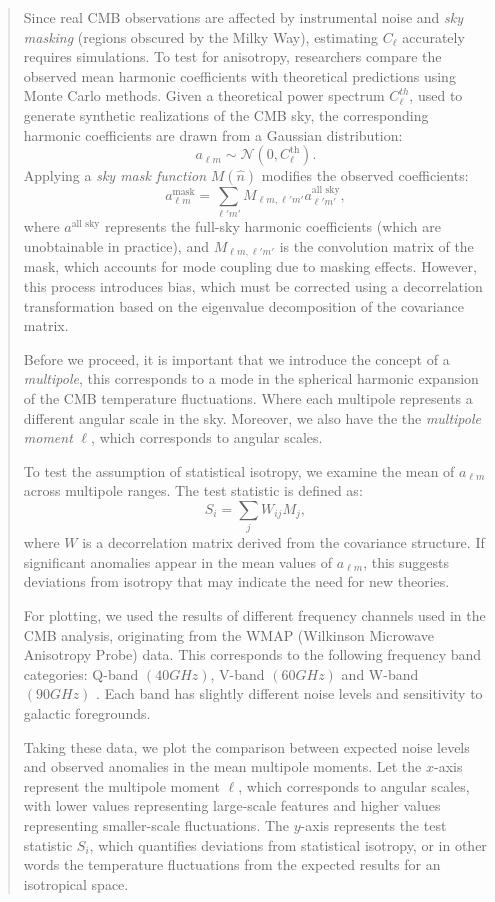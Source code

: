 \documentclass{article}
\theoremstyle{definition}
\begin{document}
\begin{abstract}
Since real CMB observations are affected by instrumental noise and \textit{sky masking} (regions obscured by the Milky Way), estimating $C_\ell$ accurately requires simulations. To test for anisotropy, researchers compare the observed mean harmonic coefficients with theoretical predictions using Monte Carlo methods.
Given a theoretical power spectrum $C^{th}_\ell$, used to generate synthetic realizations of the CMB sky, the corresponding harmonic coefficients are drawn from a Gaussian distribution:
\[
	a_{\ell m} \sim \mathcal{N} (0, C_\ell^{\text{th}}).
\]
Applying a \textit{sky mask function} $M(\hat{n})$ modifies the observed coefficients:
\[
	a^{\text{mask}}_{\ell m} = \sum_{\ell' m'} M_{\ell m, \ell' m'} a^{\text{all sky}}_{\ell' m'},
\]
where $a^{\text{all sky}}$ represents the full-sky harmonic coefficients (which are unobtainable in practice), and $M_{\ell m, \ell' m'}$ is the convolution matrix of
the mask, which accounts for mode coupling due to masking effects. However, this process introduces bias, which must be corrected using a decorrelation transformation based on the eigenvalue decomposition of the covariance matrix.

Before we proceed, it is important that we introduce the concept of a \textit{multipole}, this corresponds to a mode in the spherical harmonic expansion of the CMB temperature fluctuations. Where each multipole represents a different angular scale in the sky. Moreover, we also have the the \textit{multipole moment} $\ell$, which corresponds to angular scales.

To test the assumption of statistical isotropy, we examine the mean of $a_{\ell m}$ across multipole ranges. The test statistic  is defined as:
\[
	S_i = \sum_{j} W_{ij} M_j,
\]
where $W$ is a decorrelation matrix derived from the covariance structure. If significant anomalies appear in the mean values of $a_{\ell m}$, this suggests deviations from isotropy that may indicate the need for new theories.

For plotting, we used the results of different frequency channels used in the CMB analysis, originating from the WMAP (Wilkinson Microwave Anisotropy Probe) data. This corresponds to the following frequency band categories: Q-band $(40 GHz)$, V-band $(60 GHz)$ and W-band $(90 GHz)$ \cite{Jarosik_2011}. Each band has slightly different noise levels and sensitivity to galactic foregrounds.

Taking these data, we plot the comparison between expected noise levels and observed anomalies in the mean multipole moments. Let the $x$-axis represent the multipole moment $\ell$, which corresponds to angular scales, with lower values representing large-scale features and higher values representing smaller-scale fluctuations. The $y$-axis represents the test statistic $S_i$, which quantifies deviations from statistical isotropy, or in other words the temperature fluctuations from the expected results for an isotropical space.


\end{abstract}
\end{document}
